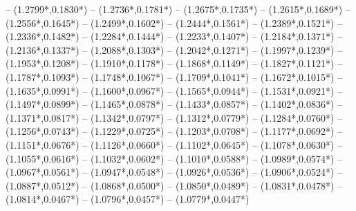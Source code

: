 {	-- ({1.2799*\dx},{0.1830*\dy})
	-- ({1.2736*\dx},{0.1781*\dy})
	-- ({1.2675*\dx},{0.1735*\dy})
	-- ({1.2615*\dx},{0.1689*\dy})
	-- ({1.2556*\dx},{0.1645*\dy})
	-- ({1.2499*\dx},{0.1602*\dy})
	-- ({1.2444*\dx},{0.1561*\dy})
	-- ({1.2389*\dx},{0.1521*\dy})
	-- ({1.2336*\dx},{0.1482*\dy})
	-- ({1.2284*\dx},{0.1444*\dy})
	-- ({1.2233*\dx},{0.1407*\dy})
	-- ({1.2184*\dx},{0.1371*\dy})
	-- ({1.2136*\dx},{0.1337*\dy})
	-- ({1.2088*\dx},{0.1303*\dy})
	-- ({1.2042*\dx},{0.1271*\dy})
	-- ({1.1997*\dx},{0.1239*\dy})
	-- ({1.1953*\dx},{0.1208*\dy})
	-- ({1.1910*\dx},{0.1178*\dy})
	-- ({1.1868*\dx},{0.1149*\dy})
	-- ({1.1827*\dx},{0.1121*\dy})
	-- ({1.1787*\dx},{0.1093*\dy})
	-- ({1.1748*\dx},{0.1067*\dy})
	-- ({1.1709*\dx},{0.1041*\dy})
	-- ({1.1672*\dx},{0.1015*\dy})
	-- ({1.1635*\dx},{0.0991*\dy})
	-- ({1.1600*\dx},{0.0967*\dy})
	-- ({1.1565*\dx},{0.0944*\dy})
	-- ({1.1531*\dx},{0.0921*\dy})
	-- ({1.1497*\dx},{0.0899*\dy})
	-- ({1.1465*\dx},{0.0878*\dy})
	-- ({1.1433*\dx},{0.0857*\dy})
	-- ({1.1402*\dx},{0.0836*\dy})
	-- ({1.1371*\dx},{0.0817*\dy})
	-- ({1.1342*\dx},{0.0797*\dy})
	-- ({1.1312*\dx},{0.0779*\dy})
	-- ({1.1284*\dx},{0.0760*\dy})
	-- ({1.1256*\dx},{0.0743*\dy})
	-- ({1.1229*\dx},{0.0725*\dy})
	-- ({1.1203*\dx},{0.0708*\dy})
	-- ({1.1177*\dx},{0.0692*\dy})
	-- ({1.1151*\dx},{0.0676*\dy})
	-- ({1.1126*\dx},{0.0660*\dy})
	-- ({1.1102*\dx},{0.0645*\dy})
	-- ({1.1078*\dx},{0.0630*\dy})
	-- ({1.1055*\dx},{0.0616*\dy})
	-- ({1.1032*\dx},{0.0602*\dy})
	-- ({1.1010*\dx},{0.0588*\dy})
	-- ({1.0989*\dx},{0.0574*\dy})
	-- ({1.0967*\dx},{0.0561*\dy})
	-- ({1.0947*\dx},{0.0548*\dy})
	-- ({1.0926*\dx},{0.0536*\dy})
	-- ({1.0906*\dx},{0.0524*\dy})
	-- ({1.0887*\dx},{0.0512*\dy})
	-- ({1.0868*\dx},{0.0500*\dy})
	-- ({1.0850*\dx},{0.0489*\dy})
	-- ({1.0831*\dx},{0.0478*\dy})
	-- ({1.0814*\dx},{0.0467*\dy})
	-- ({1.0796*\dx},{0.0457*\dy})
	-- ({1.0779*\dx},{0.0447*\dy})
}
